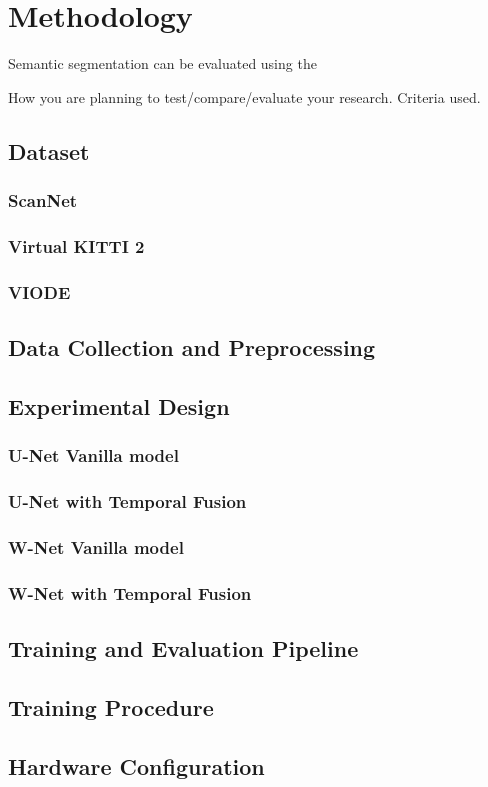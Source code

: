 

    \chapter{Methodology}
	
	Semantic segmentation can be evaluated using the 
	
    How you are planning to test/compare/evaluate your research.
    Criteria used.

    \section{Dataset}
    \subsection{ScanNet}
    \subsection{Virtual KITTI 2}
    \subsection{VIODE}
	
	\section{Data Collection and Preprocessing}
    \section{Experimental Design}
    \subsection{U-Net Vanilla model}
    \subsection{U-Net with Temporal Fusion}
    \subsection{W-Net Vanilla model}
    \subsection{W-Net with Temporal Fusion}
    \section{Training and Evaluation Pipeline}
    \section{Training Procedure}
    \section{Hardware Configuration}
    

